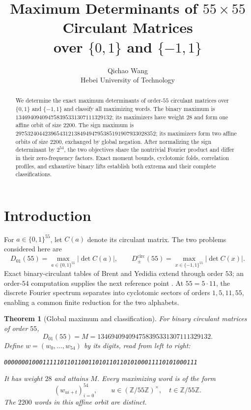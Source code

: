 \documentclass[11pt,a4paper]{article}
\title{Maximum Determinants of $55\times55$ Circulant Matrices\\over $\{0,1\}$ and $\{-1,1\}$}
\author{
  Qichao Wang\\
  Hebei University of Technology
}
\date{}
\newtheorem{theorem}{Theorem}
\theoremstyle{remark}
\newcommand{\Z}{\mathbb Z}
\newcommand{\M}{134694094094758395331307111329132}
\begin{document}
\maketitle

\begin{abstract}
We determine the exact maximum determinants of order-$55$ circulant
matrices over $\{0,1\}$ and $\{-1,1\}$ and classify all maximizing
words.  The binary maximum is
$134694094094758395331307111329132$; its maximizers have weight $28$
and form one affine orbit of size $2200$.  The sign maximum is
$297532404423965431213849494795385191907933028352$; its
maximizers form two affine orbits of size $2200$, exchanged by global
negation.  After normalizing the sign determinant by $2^{54}$,
the two objectives share the nontrivial Fourier product
and differ in their zero-frequency factors.  Exact moment
bounds, cyclotomic folds, correlation profiles, and exhaustive binary
lifts establish both extrema and their complete classifications.
\end{abstract}

\section{Introduction}

For $a\in\{0,1\}^{55}$, let $C(a)$ denote its circulant
matrix.  The two problems considered here are
\[
 D_{01}(55)=\max_{a\in\{0,1\}^{55}}|\det C(a)|,\qquad
 D_{\pm}^{\mathrm{circ}}(55)=
       \max_{x\in\{-1,1\}^{55}}|\det C(x)|.
\]
Exact binary-circulant tables of Brent and Yedidia extend through
order $53$; an order-$54$ computation supplies the next reference
point \cite{brent-yedidia,aletheia54}.
At $55=5\cdot11$, the discrete Fourier spectrum separates into
cyclotomic sectors of orders $1,5,11,55$, enabling a common
finite reduction for the two alphabets.

\begin{theorem}[Global maximum and classification]
\label{thm:main}
For binary circulant matrices of order $55$,
\[
  D_{01}(55)=M=\M.
\]
Define $w=(w_0,\ldots,w_{54})$ by its digits, read from left to right:
\begin{center}
\texttt{0000000100011111011011001101011011010100011110101000111}
\end{center}
It has weight $28$ and attains $M$. Every maximizing word is of the form
\[
 (w_{ui+t})_{i=0}^{54},
 \qquad u\in(\Z/55\Z)^\times,\quad t\in\Z/55\Z.
\]
The $2200$ words in this affine orbit are distinct.
\end{theorem}
\end{document}
